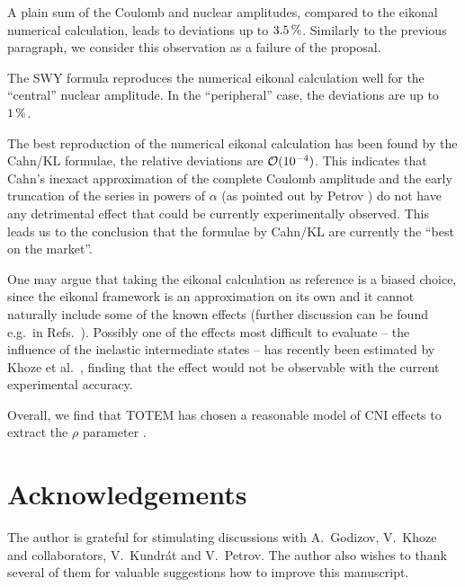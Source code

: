 \documentclass{appolb}
\def\un#1{\,{\rm #1}}
\def\NEW#1{{#1}}
\begin{document}
A plain sum of the Coulomb and nuclear amplitudes, compared to the eikonal numerical calculation, leads to deviations up to $3.5\un{\%}$. \NEW{Similarly to the previous paragraph, we consider this observation as a failure of the proposal.}

The SWY formula reproduces the numerical eikonal calculation well for the ``central'' nuclear amplitude. In the ``peripheral'' case, the deviations are up to $1\un{\%}$.

The best reproduction of the numerical eikonal calculation has been found by the Cahn/KL formulae, the relative deviations are ${\cal O}(10^{-4})$. This indicates that Cahn's inexact approximation of the complete Coulomb amplitude and the early truncation of the series in powers of $\alpha$ (as pointed out by Petrov \cite{petrov2019,petrov2020}) do not have any detrimental effect that could be currently experimentally observed. This leads us to the conclusion that the formulae by Cahn/KL are currently the ``best on the market''.

One may argue that taking the eikonal calculation as reference is a biased choice, since the eikonal framework is an approximation on its own and it cannot naturally include some of the known effects (further discussion can be found e.g.~in Refs.~\cite{thesis,petrov2018,kmr2019}). Possibly one of the effects most difficult to evaluate -- the influence of the inelastic intermediate states -- has recently been estimated by Khoze et al.~\cite{kmr2019}, finding that the effect would not be observable with the current experimental accuracy.

Overall, we find that TOTEM has chosen a reasonable model of CNI effects to extract the $\rho$ parameter \cite{totem-13tev-rho}.




\section{Acknowledgements}

The author is grateful for stimulating discussions with A.~Godizov, V.~Khoze and collaborators, V.~Kundr\'at and V.~Petrov. The author also wishes to thank several of them for valuable suggestions how to improve this manuscript.

\end{document}
